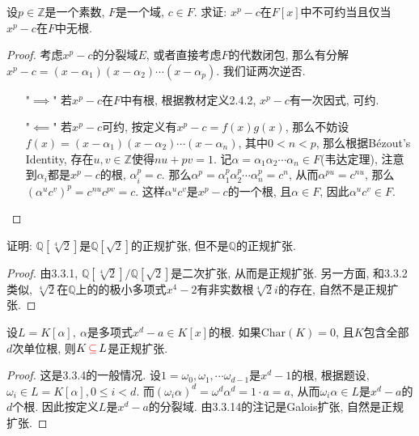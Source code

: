 \documentclass{../solutions-cn}
\begin{document}
\begin{exercise}[习题3.3.8]
    设$p \in \mathbb{Z}$是一个素数, $F$是一个域, $c \in F$. 求证: $x^p - c$在$F[x]$中不可约当且仅当$x^p - c$在$F$中无根.
\end{exercise}

\begin{proof}
    考虑$x^p - c$的分裂域$E$, 或者直接考虑$F$的代数闭包, 那么有分解$x^p - c = (x - \alpha_1)(x - \alpha_2) \cdots (x - \alpha_p)$. 我们证两次逆否.
    \begin{enumerate}
        \item["$\implies$"] 若$x^p - c$在$F$中有根, 根据教材定义2.4.2, $x^p - c$有一次因式, 可约.
        \item["$\impliedby$"] 若$x^p - c$可约, 按定义有$x^p - c = f(x)g(x)$, 那么不妨设$f(x) = (x - \alpha_1)(x - \alpha_2) \cdots (x - \alpha_n)$, 其中$0 < n < p$, 那么根据Bézout's Identity, 存在$u, v \in \mathbb{Z}$使得$nu + pv = 1$. 记$\alpha = \alpha_1\alpha_2 \cdots \alpha_n \in F$(韦达定理), 注意到$\alpha_i$都是$x^p - c$的根, $\alpha_i^p = c$. 那么$\alpha^p = \alpha_1^p\alpha_2^p \cdots \alpha_n^p = c^n$, 从而$\alpha^{pu} = c^{nu}$, 那么$(\alpha^uc^v)^p = c^{nu}c^{pv} = c$. 这样$\alpha^uc^v$是$x^p - c$的一个根, 且$\alpha \in F$, 因此$\alpha^uc^v \in F$.
    \end{enumerate}
\end{proof}

\begin{exercise}[习题3.3.11]
    证明: $\mathbb{Q}[\sqrt[4]{2}]$是$\mathbb{Q}[\sqrt{2}]$的正规扩张, 但不是$\mathbb{Q}$的正规扩张.
\end{exercise}

\begin{proof}
    由3.3.1, $\mathbb{Q}[\sqrt[4]{2}]/\mathbb{Q}[\sqrt{2}]$是二次扩张, 从而是正规扩张. 另一方面, 和3.3.2类似, $\sqrt[4]{2}$在$\mathbb{Q}$上的的极小多项式$x^4 - 2$有非实数根$\sqrt[4]{2}i$的存在, 自然不是正规扩张.
\end{proof}

\begin{exercise}[习题3.3.13]
    设$L = K[\alpha],~\alpha$是多项式$x^d - a \in K[x]$的根. 如果$\mathrm{Char}(K) = 0$, 且$K$包含全部$d$次单位根, 则$K \,\textcolor{red}{\subseteq}\, L$是正规扩张.
\end{exercise}

\begin{proof}
    这是3.3.4的一般情况. 设$1 = \omega_0, \omega_1, \cdots \omega_{d - 1}$是$x^d - 1$的根, 根据题设, $\omega_i \in L = K[\alpha], 0 \leqslant i < d$. 而$(\omega_i\alpha)^d = \omega^d\alpha^d = 1 \cdot a = a$, 从而$\omega_i\alpha \in L$是$x^d - a$的$d$个根. 因此按定义$L$是$x^d - a$的分裂域. 由3.3.14的注记是Galois扩张, 自然是正规扩张.
\end{proof}
\end{document}

